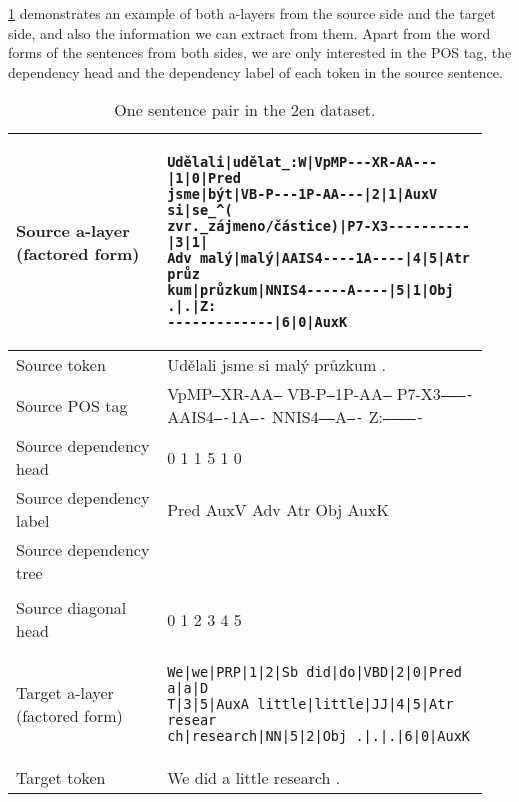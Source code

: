 \cref{tab:data-czeng} demonstrates an example of both a-layers from the source side and the target side, and also the information we can extract from them.
Apart from the word forms of the sentences from both sides, we are only interested in the POS tag, the dependency head and the dependency label of each token in the source sentence.

\begin{table}[t]
    \small
    \centering
    \begin{tabular}{p{0.3\linewidth}|p{0.64\linewidth}}
        Source a-layer (factored form) & 
\begin{verbatim}
Udělali|udělat_:W|VpMP---XR-AA---|1|0|Pred
jsme|být|VB-P---1P-AA---|2|1|AuxV si|se_^(
zvr._zájmeno/částice)|P7-X3----------|3|1|
Adv malý|malý|AAIS4----1A----|4|5|Atr průz
kum|průzkum|NNIS4-----A----|5|1|Obj .|.|Z:
-------------|6|0|AuxK
\end{verbatim}\\
        \hline
        Source token & Udělali jsme si malý průzkum .\\
        \hline
        Source POS tag & VpMP\texttt{---}XR-AA\texttt{---} VB-P\texttt{---}1P-AA\texttt{---} P7-X3\texttt{----------} AAIS4\texttt{----}1A\texttt{----} NNIS4\texttt{-----}A\texttt{----} Z:\texttt{-------------}\\
        \hline
        Source dependency head & 0 1 1 5 1 0\\
        \hline
        Source dependency label & Pred AuxV Adv Atr Obj AuxK \\
        \hline
        Source dependency tree &
        \begin{dependency}
            \begin{deptext}
            Udělali \& jsme \& si \& malý \& průzkum \&  . \\
            \end{deptext}
            \deproot{1}{Pred}
            \depedge{2}{1}{AuxV}
            \depedge{3}{1}{Adv}
            \depedge{4}{5}{Atr}
            \depedge{5}{1}{Obj}
            \deproot{6}{AuxK}
        \end{dependency} \\
        \hline
        Source diagonal head & 0 1 2 3 4 5 \\
        \hline
        \hline
        Target a-layer (factored form) & 
\begin{verbatim}
We|we|PRP|1|2|Sb did|do|VBD|2|0|Pred a|a|D
T|3|5|AuxA little|little|JJ|4|5|Atr resear
ch|research|NN|5|2|Obj .|.|.|6|0|AuxK
\end{verbatim}\\
        \hline
        Target token & We did a little research .\\
    \end{tabular}
    \caption{One sentence pair in the \cs2en dataset.}
    \label{tab:data-czeng}
\end{table}

